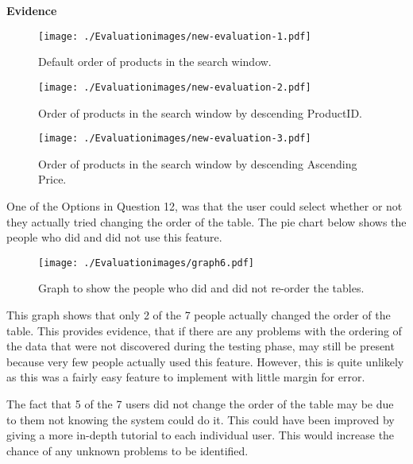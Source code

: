 \textbf{Evidence} \newline

\begin{figure}[H]
\caption{Default order of products in the search window.} \label{new-evaluation-1}
\hfill\texttt{[image: ./Evaluationimages/new-evaluation-1.pdf]}
\end{figure}

\begin{figure}[H]
\caption{Order of products in the search window by descending ProductID.} \label{new-evaluation-2}
\hfill\texttt{[image: ./Evaluationimages/new-evaluation-2.pdf]}
\end{figure}

\begin{figure}[H]
\caption{Order of products in the search window by descending Ascending Price.} \label{new-evaluation-3}
\hfill\texttt{[image: ./Evaluationimages/new-evaluation-3.pdf]}
\end{figure}

One of the Options in Question 12, was that the user could select whether or not they actually tried changing the order of the table. The pie chart below shows the people who did and did not use this feature.

\begin{figure}[H]
\caption{Graph to show the people who did and did not re-order the tables.} \label{graph6}
\hfill\texttt{[image: ./Evaluationimages/graph6.pdf]}
\end{figure}

This graph shows that only 2 of the 7 people actually changed the order of the table. This provides evidence, that if there are any problems with the ordering of the data that were not discovered during the testing phase, may still be present because very few people actually used this feature. However, this is quite unlikely as this was a fairly easy feature to implement with little margin for error.

The fact that 5 of the 7 users did not change the order of the table may be due to them not knowing the system could do it. This could have been improved by giving a more in-depth tutorial to each individual user. This would increase the chance of any unknown problems to be identified.

















